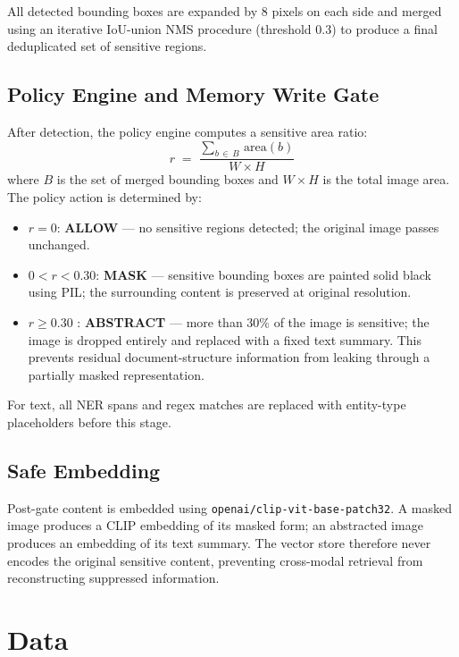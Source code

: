 \documentclass[11pt]{article}
\begin{document}
All detected bounding boxes are expanded by 8 pixels on each side and merged using an iterative IoU-union NMS procedure (threshold 0.3) to produce a final deduplicated set of sensitive regions.

\subsection{Policy Engine and Memory Write Gate}

After detection, the policy engine computes a sensitive area ratio:
\[
r \;=\; \frac{\displaystyle\sum_{b \,\in\, B}\,\mathrm{area}(b)}{W \times H}
\]
where $B$ is the set of merged bounding boxes and $W \times H$ is the total image area. The policy action is determined by:

\begin{itemize}[noitemsep]
    \item $r = 0$: \textbf{ALLOW} --- no sensitive regions detected; the original image passes unchanged.
    \item $0 < r < 0.30$: \textbf{MASK} --- sensitive bounding boxes are painted solid black using PIL; the surrounding content is preserved at original resolution.
    \item $r \ge 0.30$ : \textbf{ABSTRACT} --- more than 30\% of the image is sensitive; the image is dropped entirely and replaced with a fixed text summary. This prevents residual document-structure information from leaking through a partially masked representation.
\end{itemize}

For text, all NER spans and regex matches are replaced with entity-type placeholders before this stage.

\subsection{Safe Embedding}

Post-gate content is embedded using \texttt{openai/clip-vit-base-patch32}. A masked image produces a CLIP embedding of its masked form; an abstracted image produces an embedding of its text summary. The vector store therefore never encodes the original sensitive content, preventing cross-modal retrieval from reconstructing suppressed information.

\section{Data}
\end{document}
